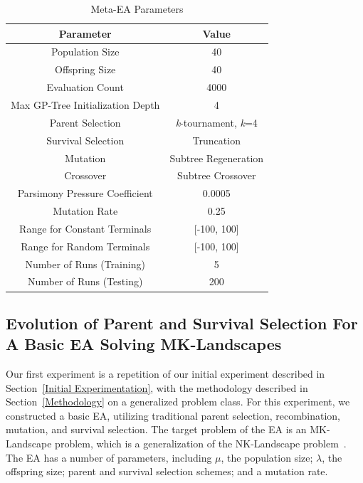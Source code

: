\documentclass[sigconf]{acmart}
\begin{document}
\begin{table}
	\centering
	\caption{Meta-EA Parameters}
	\label{tab:Meta-EA Parameters}
	\begin{tabular}{c|c}
		\toprule
		Parameter& Value\\
		\midrule
		Population Size & 40 \\
		\hline
		Offspring Size & 40\\
		\hline
		Evaluation Count & 4000\\
		\hline
		Max GP-Tree Initialization Depth & 4\\
		\hline
		Parent Selection & \textit{k}-tournament, \textit{k}=4 \\
		\hline
		Survival Selection & Truncation\\
		\hline
		Mutation & Subtree Regeneration\\
		\hline
		Crossover & Subtree Crossover\\
		\hline
		Parsimony Pressure Coefficient & 0.0005\\
		\hline
		Mutation Rate & 0.25\\
		\hline
		Range for Constant Terminals & [-100, 100]\\
		\hline
		Range for Random Terminals & [-100, 100]\\
		\hline
		Number of Runs (Training) & 5 \\
		\hline
		Number of Runs (Testing) & 200\\
		
		\bottomrule
	\end{tabular}
\end{table}

\subsection{Evolution of Parent and Survival Selection For A Basic EA Solving MK-Landscapes}
\label{Evolution of Parent and Survival Selection For A Basic EA Solving MK-Landscapes}

Our first experiment is a repetition of our initial experiment described in Section~\ref{Initial Experimentation}, with the methodology described in Section~\ref{Methodology} on a generalized problem class. For this experiment, we constructed a basic EA, utilizing traditional parent selection, recombination, mutation, and survival selection. The target problem of the EA is an MK-Landscape problem, which is a generalization of the NK-Landscape problem~\citep{whitley2016gray,kaufmann1993origins}. The EA has a number of parameters, including $\mu$, the population size; $\lambda$, the offspring size; parent and survival selection schemes; and a mutation rate. 
\end{document}
